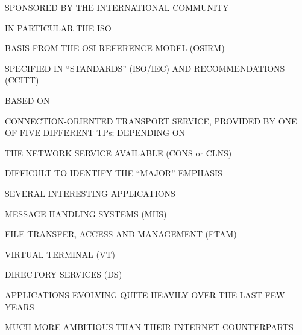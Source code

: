 

\begin{bwslide}

\begin{nrtc}
\item	SPONSORED BY THE INTERNATIONAL COMMUNITY
    \begin{nrtc}
    \item	IN PARTICULAR THE ISO
    \end{nrtc}
    BASIS FROM THE OSI REFERENCE MODEL (OSIRM)

\item	SPECIFIED IN ``STANDARDS'' (ISO/IEC)  AND RECOMMENDATIONS (CCITT)

\item	BASED ON
    \begin{nrtc}
    \item	CONNECTION-ORIENTED TRANSPORT SERVICE,
		PROVIDED BY ONE OF FIVE DIFFERENT TPs; DEPENDING ON

    \item	THE NETWORK SERVICE AVAILABLE (CONS or CLNS)
    \end{nrtc}

\item	DIFFICULT TO IDENTIFY THE ``MAJOR'' EMPHASIS
\end{nrtc}
\end{bwslide}


\begin{bwslide}

\begin{nrtc}
\item	SEVERAL INTERESTING APPLICATIONS
    \begin{nrtc}
    \item	MESSAGE HANDLING SYSTEMS (MHS)

    \item	FILE TRANSFER, ACCESS AND MANAGEMENT (FTAM)

    \item	VIRTUAL TERMINAL (VT)

    \item	DIRECTORY SERVICES (DS)
    \end{nrtc}

\item	APPLICATIONS EVOLVING QUITE HEAVILY OVER THE LAST FEW YEARS

\item	MUCH MORE AMBITIOUS THAN THEIR INTERNET COUNTERPARTS
\end{nrtc}
\end{bwslide}


